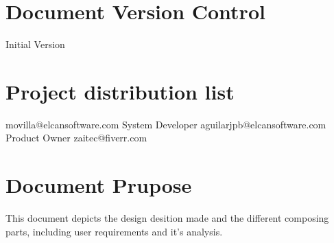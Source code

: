 \section{Document Version Control}
\begin{elcanversions}
	 {Initial Version}
\end{elcanversions}

\section{Project distribution list}

\begin{elcandistribution}

	 {movilla@elcansoftware.com} {\distribdate} 
	 {System Developer} {aguilarjpb@elcansoftware.com} {\distribdate}
	 {Product Owner} {zaitec@fiverr.com} {\distribdate}	
\end{elcandistribution}

\section{Document Prupose}
This document depicts the design desition made and the different composing parts, including user requirements and it's analysis.

